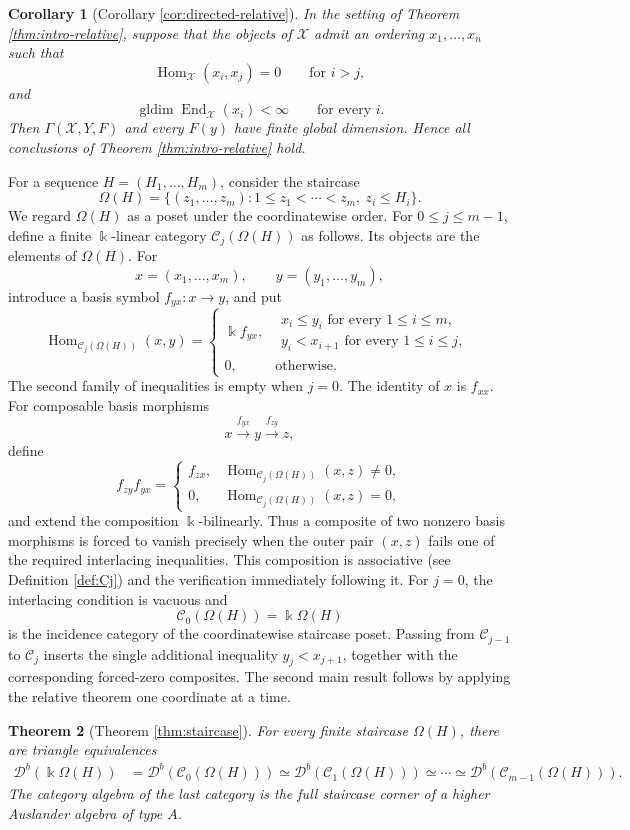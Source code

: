 \documentclass[12pt,a4paper,english,reqno]{amsart}
\theoremstyle{plain}
\newtheorem{theorem}{Theorem}[section]
\newtheorem{corollary}[theorem]{Corollary}
\theoremstyle{definition}
\newcommand{\kk}{\Bbbk}
\newcommand{\Hom}{\operatorname{Hom}}
\newcommand{\End}{\operatorname{End}}
\newcommand{\gldim}{\operatorname{gldim}}
\newcommand{\C}{\mathcal C}
\newcommand{\X}{\mathcal X}
\newcommand{\G}{\Gamma}
\newcommand{\Db}[1]{{\mathscr D}^b(#1)}
\begin{document}
\begin{corollary}[Corollary \ref{cor:directed-relative}]
\label{cor:intro-directed-relative}
In the setting of Theorem \ref{thm:intro-relative}, suppose that the objects of
$\X$ admit an ordering $x_1,\ldots,x_n$ such that
\[
 \Hom_{\X}(x_i,x_j)=0\qquad\text{for }i>j,
\]
and
\[
 \gldim\End_{\X}(x_i)<\infty\qquad\text{for every }i.
\]
Then $\G(\X,Y,F)$ and every $F(y)$ have finite global dimension.
Hence all conclusions of Theorem \ref{thm:intro-relative} hold.
\end{corollary}


For a sequence $H=(H_1,\ldots,H_m)$, consider the staircase
\[
 \Omega(H)=
 \{(z_1,\ldots,z_m):1\leq z_1<\cdots<z_m,\ z_i\leq H_i\}.
\]
We regard $\Omega(H)$ as a poset under the coordinatewise order.  For
$0\leq j\leq m-1$, define a finite $\kk$-linear category
$\C_j(\Omega(H))$ as follows.  Its objects are the elements of
$\Omega(H)$.  For
\[
 x=(x_1,\ldots,x_m),\qquad y=(y_1,\ldots,y_m),
\]
introduce a basis symbol $f_{yx}:x\to y$, and put
\[
 \Hom_{\C_j(\Omega(H))}(x,y)=
 \begin{cases}
  \kk f_{yx},&
  \substack{x_i\leq y_i\text{ for every }1\leq i\leq m,\\
  y_i<x_{i+1}\text{ for every }1\leq i\leq j,}\\
  0,&\text{otherwise}.
 \end{cases}
\]
The second family of inequalities is empty when $j=0$.  The identity of
$x$ is $f_{xx}$.  For composable basis morphisms
\[
 x\xrightarrow{f_{yx}}y\xrightarrow{f_{zy}}z,
\]
define
\[
 f_{zy}f_{yx}=
 \begin{cases}
  f_{zx},&\Hom_{\C_j(\Omega(H))}(x,z)\neq0,\\
  0,&\Hom_{\C_j(\Omega(H))}(x,z)=0,
 \end{cases}
\]
and extend the composition $\kk$-bilinearly.  Thus a composite of two
nonzero basis morphisms is forced to vanish precisely when the outer pair
$(x,z)$ fails one of the required interlacing inequalities.  This
composition is associative (see Definition \ref{def:Cj}) and the verification
immediately following it.  For $j=0$, the interlacing condition is vacuous and
\[
 \C_0(\Omega(H))=\kk\Omega(H)
\]
is the incidence category of the coordinatewise staircase poset.  Passing
from $\C_{j-1}$ to $\C_j$ inserts the single additional inequality
$y_j<x_{j+1}$, together with the corresponding forced-zero composites.
The second main result follows by applying the relative theorem one
coordinate at a time.

\begin{theorem}[Theorem \ref{thm:staircase}]
\label{thm:intro-staircase}
For every finite staircase $\Omega(H)$, there are triangle equivalences
\[
\begin{aligned}
 \Db{\kk\Omega(H)}
 &=\Db{\C_0(\Omega(H))}
 \simeq\Db{\C_1(\Omega(H))}\simeq\cdots\simeq
 \Db{\C_{m-1}(\Omega(H))}.
\end{aligned}
\]
The category algebra of the last category is the full staircase corner of a
higher Auslander algebra of type $A$.
\end{theorem}
\end{document}
